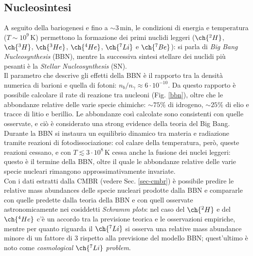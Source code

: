 \subsection{Nucleosintesi}

A seguito della bariogenesi e fino a $ \sim 3 \,\text{min} $, le condizioni di energia e temperatura ($ T \sim 10^9 \,\text{K} $) permettono la formazione dei primi nuclidi leggeri ($ \ch{^2 H} $, $ \ch{^3 H} $, $ \ch{^3 He} $, $ \ch{^4 He} $, $ \ch{^7 Li} $ e $ \ch{^7 Be} $): si parla di \textit{Big Bang Nucleosynthesis} (BBN), mentre la successiva sintesi stellare dei nuclidi più pesanti è la \textit{Stellar Nucleosynthesis} (SN).\\
Il parametro che descrive gli effetti della BBN è il rapporto tra la densità numerica di barioni e quella di fotoni: $ n_b / n_\gamma \approx 6 \cdot 10^{-10} $. Da questo rapporto è possibile calcolare il rate di reazione tra nucleoni (Fig. \ref{bbn}), oltre che le abbondanze relative delle varie specie chimiche: $ \sim 75\% $ di idrogeno, $ \sim 25\% $ di elio e tracce di litio e berillio. Le abbondanze così calcolate sono consistenti con quelle osservate, e ciò è considerato una strong evidence della teoria del Big Bang.\\
Durante la BBN si instaura un equilibrio dinamico tra materia e radiazione tramite reazioni di fotodissociazione: col calare della temperatura, però, queste reazioni cessano, e con $ T \lesssim 3 \cdot 10^8 \,\text{K} $ cessa anche la fusione dei nuclei leggeri: questo è il termine della BBN, oltre il quale le abbondanze relative delle varie specie nucleari rimangono approssimativamente invariate.\\
Con i dati estratti dalla CMBR (vedere Sec. \ref{sec-cmbr}) è possibile predire le relative mass abundances delle specie nucleari prodotte dalla BBN e compararle con quelle predette dalla teoria della BBN e con quell osservate astronomicamente nei cosiddetti \textit{Schramm plots}: nel caso del $ \ch{^2 H} $ e del $ \ch{^4 He} $ c'è un accordo tra la previsione teorica e le osservazioni empiriche, mentre per quanto riguarda il $ \ch{^7 Li} $ si osserva una relative mass abundance minore di un fattore di 3 rispetto alla previsione del modello BBN; quest'ultimo è noto come \textit{cosmological} $ \ch{^7 Li} $ \textit{problem}.\\
